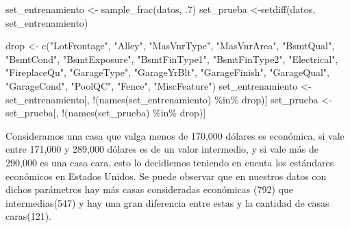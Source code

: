 \documentclass[
]{article}
\newenvironment{Shaded}{\begin{snugshade}}{\end{snugshade}}
\newcommand{\DecValTok}[1]{\textcolor[rgb]{0.00,0.00,0.81}{#1}}
\newcommand{\FunctionTok}[1]{\textcolor[rgb]{0.00,0.00,0.00}{#1}}
\newcommand{\NormalTok}[1]{#1}
\newcommand{\OtherTok}[1]{\textcolor[rgb]{0.56,0.35,0.01}{#1}}
\newcommand{\SpecialCharTok}[1]{\textcolor[rgb]{0.00,0.00,0.00}{#1}}
\newcommand{\StringTok}[1]{\textcolor[rgb]{0.31,0.60,0.02}{#1}}
\begin{document}
\begin{Shaded}
\begin{Highlighting}[]
\NormalTok{set\_entrenamiento }\OtherTok{\textless{}{-}} \FunctionTok{sample\_frac}\NormalTok{(datos, .}\DecValTok{7}\NormalTok{)}
\NormalTok{set\_prueba }\OtherTok{\textless{}{-}}\FunctionTok{setdiff}\NormalTok{(datos, set\_entrenamiento)}


\NormalTok{drop }\OtherTok{\textless{}{-}} \FunctionTok{c}\NormalTok{(}\StringTok{"LotFrontage"}\NormalTok{, }\StringTok{"Alley"}\NormalTok{, }\StringTok{"MasVnrType"}\NormalTok{, }\StringTok{"MasVnrArea"}\NormalTok{, }\StringTok{"BsmtQual"}\NormalTok{, }\StringTok{"BsmtCond"}\NormalTok{, }\StringTok{"BsmtExposure"}\NormalTok{, }\StringTok{"BsmtFinType1"}\NormalTok{, }\StringTok{"BsmtFinType2"}\NormalTok{, }\StringTok{"Electrical"}\NormalTok{, }\StringTok{"FireplaceQu"}\NormalTok{, }\StringTok{"GarageType"}\NormalTok{, }\StringTok{"GarageYrBlt"}\NormalTok{, }\StringTok{"GarageFinish"}\NormalTok{, }\StringTok{"GarageQual"}\NormalTok{, }\StringTok{"GarageCond"}\NormalTok{, }\StringTok{"PoolQC"}\NormalTok{, }\StringTok{"Fence"}\NormalTok{, }\StringTok{"MiscFeature"}\NormalTok{)}
\NormalTok{set\_entrenamiento }\OtherTok{\textless{}{-}}\NormalTok{ set\_entrenamiento[, }\SpecialCharTok{!}\NormalTok{(}\FunctionTok{names}\NormalTok{(set\_entrenamiento) }\SpecialCharTok{\%in\%}\NormalTok{ drop)]}
\NormalTok{set\_prueba }\OtherTok{\textless{}{-}}\NormalTok{ set\_prueba[, }\SpecialCharTok{!}\NormalTok{(}\FunctionTok{names}\NormalTok{(set\_prueba) }\SpecialCharTok{\%in\%}\NormalTok{ drop)]}
\end{Highlighting}
\end{Shaded}

Consideramos una casa que valga menos de 170,000 dólares es económica,
si vale entre 171,000 y 289,000 dólares es de un valor intermedio, y si
vale más de 290,000 es una casa cara, esto lo decidiemos teniendo en
cuenta los estándares económicos en Estados Unidos. Se puede observar
que en nuestros datos con dichos parámetros hay más casas consideradas
económicas (792) que intermedias(547) y hay una gran diferencia entre
estas y la cantidad de casas caras(121).
\end{document}
